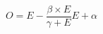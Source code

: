 \documentclass[10pt,a4paper]{article}
\begin{document}
$$ O = E - \frac{\beta \times E}{\gamma + E} E + \alpha $$
\end{document}
